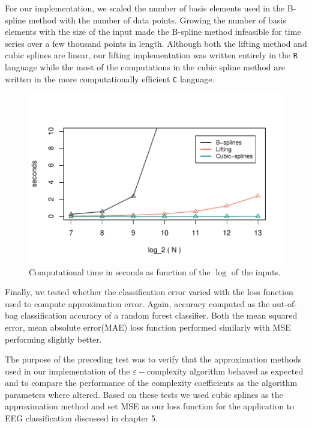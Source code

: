 For our implementation, we scaled the number of basis elements used in the B-spline method with the number of data points. Growing the number of basis elements with the size of the input made the B-spline method infeasible for time series over a few thousand points in length. Although both 
the lifting method and cubic splines are linear, our lifting 
implementation was written entirely in the \texttt{R} 
language while the most of the computations in the cubic spline method are written in the more computationally efficient \texttt{C} language. 

\begin{figure}[!htbp]
  \begin{center}
  \includegraphics[width = \textwidth, keepaspectratio]{./figs/benchmark-benchmark.pdf}
  \end{center}
  \caption{Computational time in seconds as function of 
  the $\log$ of the inputs.}
  \label{fig:benchmark} 
\end{figure}

Finally, we tested whether the classification error varied with the loss function used to compute approximation error. Again, accuracy computed as the out-of-bag classification accuracy of a random forest classifier. Both the mean squared error, mean absolute error(MAE) loss function performed similarly with MSE performing slightly better. 


The purpose of the preceding test was to verify that the approximation methods used in our implementation of the $\varepsilon-$complexity algorithm behaved as expected and to compare the performance of the complexity coefficients as the algorithm parameters where altered. Based on these tests we used cubic splines as the approximation method and set MSE as our loss function for the application to EEG classification discussed in chapter 5.



